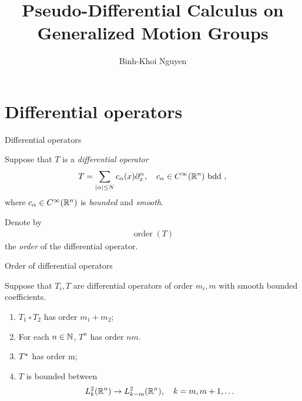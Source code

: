 \documentclass{beamer}
\title{Pseudo-Differential Calculus on Generalized Motion Groups}
\author{Binh-Khoi Nguyen}
\DeclareMathOperator{\order}{order}
\begin{document}
\maketitle

\section{Differential operators}

\renewcommand \Group {\R^n}

\begin{frame}
    {Differential operators}

    Suppose that $T$ is a \emph{differential operator}
    \begin{align*}
        T =
        \sum_{\abs \alpha \leq N}
        c_\alpha(x)
        \iD {x^\alpha},
        \quad
        c_\alpha \in \SmoothFunctions {\R^n}
        \text{ bdd },
    \end{align*}
    where $c_\alpha \in {C^\infty(\mathbb{R}^n)}$ is \emph{bounded} and \emph{smooth}.

    \pause

    Denote by
    \begin{align*}
        \order(T)
    \end{align*}
    the \emph{order} of the differential operator.
\end{frame}

\begin{frame}
    {Order of differential operators}

    Suppose that $T_i, T$ are differential operators
    of order $m_i, m$
    with smooth bounded coefficients.

    \begin{enumerate}
        \item $T_1 \circ T_2$ has order $m_1 + m_2$;
            \pause
        \item For each $n \in \mathbb{N}$, $T^n$ has order $n m$.
            \pause
        \item ${T}^\star$ has order m;
            \pause
        \item $T$ is bounded between
            \begin{align*}
                \Sobolev k \to \Sobolev {k - m},
                \quad k = m, m + 1, \dots
            \end{align*}
    \end{enumerate}
\end{frame}
\end{document}
